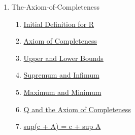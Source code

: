 \clearpage
\renewcommand{\notetitle}{Table of Contents}
\label{toc}
\begin{enumerate}

\item The-Axiom-of-Completeness
\begin{enumerate}
\item \hyperref[202501180703]{Initial Definition for R}
\item \hyperref[202501180727]{Axiom of Completeness}
\item \hyperref[202501180734]{Upper and Lower Bounds}
\item \hyperref[202501180743]{Supremum and Infimum}
\item \hyperref[202501181241]{Maximum and Minimum}
\item \hyperref[202501181257]{Q and the Axiom of Completeness}
\item \hyperref[202501181310]{sup(c + A) = c + sup A}
\end{enumerate}
\end{enumerate}

\newpage
